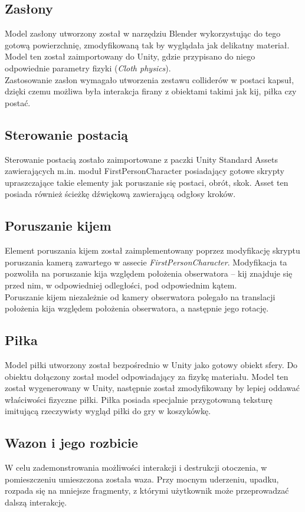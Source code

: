 \subsection{Zasłony}
Model zasłony utworzony został w narzędziu Blender wykorzystując do tego gotową powierzchnię, zmodyfikowaną tak by wyglądała jak delikatny materiał. Model ten został zaimportowany do Unity, gdzie przypisano do niego odpowiednie parametry fizyki (\textit{Cloth physics}). \\
Zastosowanie zasłon wymagało utworzenia zestawu colliderów w postaci kapsuł, dzięki czemu możliwa była interakcja firany z obiektami takimi jak kij, piłka czy postać.

\subsection{Sterowanie postacią}
Sterowanie postacią zostało zaimportowane z paczki Unity Standard Assets zawierających m.in. moduł FirstPersonCharacter posiadający gotowe skrypty upraszczające takie elementy jak poruszanie się postaci, obrót, skok. Asset ten posiada również ścieżkę dźwiękową zawierającą odgłosy kroków.

\subsection{Poruszanie kijem}
Element poruszania kijem został zaimplementowany poprzez modyfikację skryptu poruszania kamerą zawartego w assecie \textit{FirstPersonCharacter}. Modyfikacja ta pozwoliła na poruszanie kija względem położenia obserwatora – kij znajduje się przed nim, w odpowiedniej odległości, pod odpowiednim kątem. \\
Poruszanie kijem niezależnie od kamery obserwatora polegało na translacji położenia kija względem położenia obserwatora, a następnie jego rotację.

\subsection{Piłka}
Model piłki utworzony został bezpośrednio w Unity jako gotowy obiekt sfery. Do obiektu dołączony został model odpowiadający za fizykę materiału. Model ten został wygenerowany w Unity, następnie został zmodyfikowany by lepiej oddawać właściwości fizyczne piłki. Piłka posiada specjalnie przygotowaną teksturę imitującą rzeczywisty wygląd piłki do gry w koszykówkę.

\subsection{Wazon i jego rozbicie}
W celu zademonstrowania możliwości interakcji i destrukcji otoczenia, w pomieszczeniu umieszczona została waza. Przy mocnym uderzeniu, upadku, rozpada się na mniejsze fragmenty, z którymi użytkownik może przeprowadzać dalszą interakcję.

